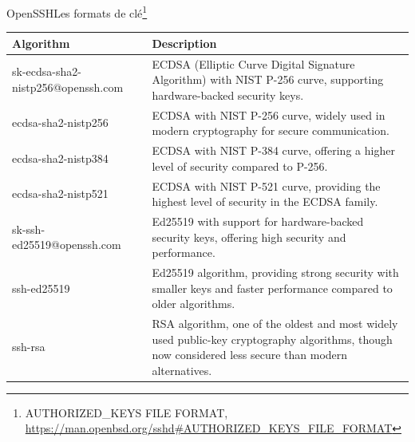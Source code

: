 \documentclass{beamer}
\begin{document}
    \begin{frame}{OpenSSH}{Les formats de clé\footnote{AUTHORIZED\_KEYS FILE FORMAT, \url{https://man.openbsd.org/sshd\#AUTHORIZED_KEYS_FILE_FORMAT}}}
        \begin{footnotesize}
            \begin{table}[h!]
                \centering
                \begin{tabular}{|p{3cm}|p{8cm}|}
                    \hline
                    \textbf{Algorithm}                 & \textbf{Description}                                                                                                                                  \\
                    \hline
                    sk-ecdsa-sha2-nistp256@openssh.com & ECDSA (Elliptic Curve Digital Signature Algorithm) with NIST P-256 curve, supporting hardware-backed security keys.                                   \\
                    \hline
                    ecdsa-sha2-nistp256                & ECDSA with NIST P-256 curve, widely used in modern cryptography for secure communication.                                                             \\
                    \hline
                    ecdsa-sha2-nistp384                & ECDSA with NIST P-384 curve, offering a higher level of security compared to P-256.                                                                   \\
                    \hline
                    ecdsa-sha2-nistp521                & ECDSA with NIST P-521 curve, providing the highest level of security in the ECDSA family.                                                             \\
                    \hline
                    sk-ssh-ed25519@openssh.com         & Ed25519 with support for hardware-backed security keys, offering high security and performance.                                                       \\
                    \hline
                    ssh-ed25519                        & Ed25519 algorithm, providing strong security with smaller keys and faster performance compared to older algorithms.                                   \\
                    \hline
                    ssh-rsa                            & RSA algorithm, one of the oldest and most widely used public-key cryptography algorithms, though now considered less secure than modern alternatives. \\
                    \hline
                \end{tabular}
            \end{table}
        \end{footnotesize}
    \end{frame}
\end{document}
